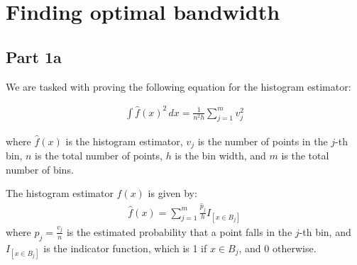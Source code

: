 \section{Finding optimal bandwidth}
\subsection{Part 1a}
We are tasked with proving the following equation for the histogram estimator:

\begin{align}
	\int \hat{f}(x)^2 \, dx = \frac{1}{n^2 h} \sum_{j=1}^{m} v_j^2
\end{align}

where $\hat{f}(x)$ is the histogram estimator, $v_j$  is the number of
points in the \( j \)-th bin, \( n \) is the total number of points, \( h \) is
the bin width, and \( m \) is the total number of bins.

The histogram estimator \( \hat{f}(x) \) is given by:
\begin{align}
	\hat{f}(x) = \sum_{j=1}^{m} \frac{\hat{p}_j}{h} I_{[x \in B_j]}
\end{align}
where \( \hat{p}_j = \frac{v_j}{n} \) is the estimated probability that a point
falls in the \( j \)-th bin, and \( I_{[x \in B_j]} \) is the indicator
function, which is 1 if \( x \in B_j \), and 0 otherwise.

